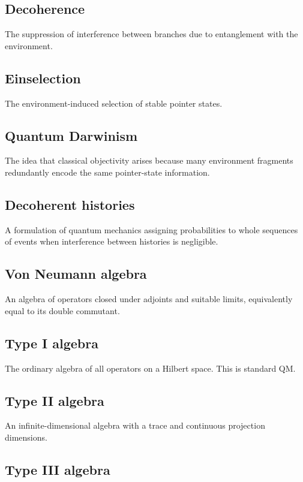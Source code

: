 \documentclass[11pt,a4paper]{article}
\begin{document}
\subsection{Decoherence}

The suppression of interference between branches due to entanglement with the environment.

\subsection{Einselection}

The environment-induced selection of stable pointer states.

\subsection{Quantum Darwinism}

The idea that classical objectivity arises because many environment fragments redundantly encode the same pointer-state information.

\subsection{Decoherent histories}

A formulation of quantum mechanics assigning probabilities to whole sequences of events when interference between histories is negligible.

\subsection{Von Neumann algebra}

An algebra of operators closed under adjoints and suitable limits, equivalently equal to its double commutant.

\subsection{Type I algebra}

The ordinary algebra of all operators on a Hilbert space. This is standard QM.

\subsection{Type II algebra}

An infinite-dimensional algebra with a trace and continuous projection dimensions.

\subsection{Type III algebra}
\end{document}

